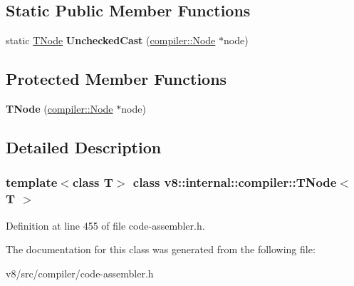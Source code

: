 \subsection*{Static Public Member Functions}
\begin{DoxyCompactItemize}
\item 
\mbox{\label{classv8_1_1internal_1_1compiler_1_1TNode_a6b126ecf0bd46f3106a39c2bfac01942}} 
static \mbox{\hyperlink{classv8_1_1internal_1_1compiler_1_1TNode}{T\+Node}} {\bfseries Unchecked\+Cast} (\mbox{\hyperlink{classv8_1_1internal_1_1compiler_1_1Node}{compiler\+::\+Node}} $\ast$node)
\end{DoxyCompactItemize}
\subsection*{Protected Member Functions}
\begin{DoxyCompactItemize}
\item 
\mbox{\label{classv8_1_1internal_1_1compiler_1_1TNode_aa4de81c8a9e3579e29ae1b63fa31cb73}} 
{\bfseries T\+Node} (\mbox{\hyperlink{classv8_1_1internal_1_1compiler_1_1Node}{compiler\+::\+Node}} $\ast$node)
\end{DoxyCompactItemize}


\subsection{Detailed Description}
\subsubsection*{template$<$class T$>$\newline
class v8\+::internal\+::compiler\+::\+T\+Node$<$ T $>$}



Definition at line 455 of file code-\/assembler.\+h.



The documentation for this class was generated from the following file\+:\begin{DoxyCompactItemize}
\item 
v8/src/compiler/code-\/assembler.\+h\end{DoxyCompactItemize}
